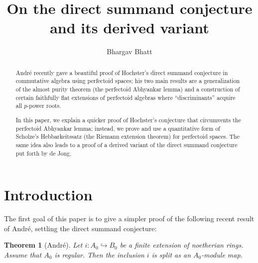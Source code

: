 \documentclass[10pt,reqno]{amsart}
\begin{document}
\newtheorem{theorem}{Theorem}[section]
\newtheorem*{theorem*}{Theorem}
\newtheorem*{definition*}{Definition}
\newtheorem{proposition}[theorem]{Proposition}
\newtheorem{lemma}[theorem]{Lemma}
\newtheorem{corollary}[theorem]{Corollary}

\theoremstyle{definition}
\newtheorem{definition}[theorem]{Definition}
\newtheorem{question}[theorem]{Question}
\newtheorem{remark}[theorem]{Remark}
\newtheorem{warning}[theorem]{Warning}
\newtheorem{example}[theorem]{Example}
\newtheorem{notation}[theorem]{Notation}
\newtheorem{convention}[theorem]{Convention}
\newtheorem{assumption}[theorem]{Assumption}
\newtheorem{construction}[theorem]{Construction}
\newtheorem{claim}[theorem]{Claim}



\title{On the direct summand conjecture and its derived variant}
\author{Bhargav Bhatt}
\address{Department of Mathematics \\ University of Michigan, Ann Arbor}
\begin{abstract}
Andr\'e recently gave a beautiful proof of Hochster's direct summand conjecture in commutative algebra using perfectoid spaces; his two main results are a generalization of the almost purity theorem (the perfectoid Abhyankar lemma) and a construction of certain faithfully flat extensions of perfectoid algebras where ``discriminants'' acquire all $p$-power roots. 

In this paper, we explain a quicker proof of Hochster's conjecture that circumvents the perfectoid Abhyankar lemma; instead, we prove and use a quantitative form of Scholze's Hebbarkeitssatz (the Riemann extension theorem) for perfectoid spaces. The same idea also leads to a proof of a derived variant of the direct summand conjecture put forth by de Jong. 
\end{abstract}
\maketitle


\section{Introduction}

The first goal of this paper is to give a simpler proof of the following recent result of Andr\'e, settling the direct summand conjecture:

\begin{theorem}[Andr\'e]
\label{thm:DSCIntro}
Let $i:A_0 \hookrightarrow B_0$ be a finite extension of noetherian rings. Assume that $A_0$ is regular. Then the inclusion $i$ is split as an $A_0$-module map.
\end{theorem}
\end{document}
